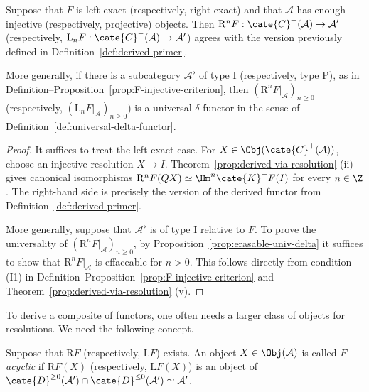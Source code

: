 \begin{proposition}
	Suppose that $F$ is left exact (respectively, right exact) and that
	$\mathcal{A}$ has enough injective (respectively, projective) objects. Then
	$\mathrm{R}^nF:\cate{C}^+(\mathcal{A})\to\mathcal{A}'$ (respectively,
	$\mathrm{L}_nF:\cate{C}^-(\mathcal{A})\to\mathcal{A}'$) agrees with the
	version previously defined in Definition~\ref{def:derived-primer}.

	More generally, if there is a subcategory $\mathcal{A}^\flat$ of type I
	(respectively, type P), as in
	Definition--Proposition~\ref{prop:F-injective-criterion}, then
	$(\mathrm{R}^nF|_{\mathcal{A}})_{n\geq0}$ (respectively,
	$(\mathrm{L}_nF|_{\mathcal{A}})_{n\geq0}$) is a universal
	$\delta$-functor in the sense of
	Definition~\ref{def:universal-delta-functor}.
\end{proposition}
\begin{proof}
	It suffices to treat the left-exact case. For
	$X\in\Obj(\cate{C}^+(\mathcal{A}))$, choose an injective resolution
	$X\to I$. Theorem~\ref{prop:derived-via-resolution} (ii) gives canonical
	isomorphisms
	$\mathrm{R}^nF(QX)\simeq\Hm^n\cate{K}^+F(I)$ for every $n\in\Z$. The
	right-hand side is precisely the version of the derived functor from
	Definition~\ref{def:derived-primer}.

	More generally, suppose that $\mathcal{A}^\flat$ is of type I relative to
	$F$. To prove the universality of
	$(\mathrm{R}^nF|_{\mathcal{A}})_{n\geq0}$, by
	Proposition~\ref{prop:erasable-univ-delta} it suffices to show that
	$\mathrm{R}^nF|_{\mathcal{A}}$ is effaceable for $n>0$. This follows
	directly from condition (I1) in
	Definition--Proposition~\ref{prop:F-injective-criterion} and
	Theorem~\ref{prop:derived-via-resolution} (v).
\end{proof}

To derive a composite of functors, one often needs a larger class of objects
for resolutions. We need the following concept.

\begin{definition}\label{def:F-acyclic-object}
	Suppose that $\mathrm{R}F$ (respectively, $\mathrm{L}F$) exists. An object
	$X\in\Obj(\mathcal{A})$ is called \emph{$F$-acyclic} if
	$\mathrm{R}F(X)$ (respectively, $\mathrm{L}F(X)$) is an object of
	$\cate{D}^{\geq0}(\mathcal{A}')\cap\cate{D}^{\leq0}(\mathcal{A}')
	\simeq\mathcal{A}'$.
\end{definition}

